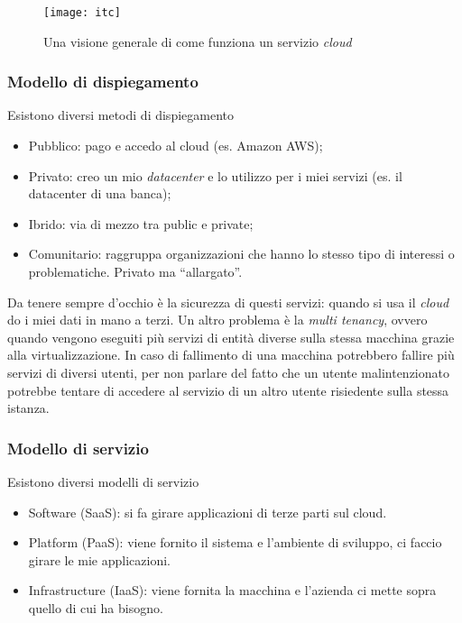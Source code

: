 \begin{figure}[H]
 \centering
 \texttt{[image: itc]}
 \caption{Una visione generale di come funziona un servizio \textit{cloud}}
\end{figure}

\subsubsection{Modello di dispiegamento}

Esistono diversi metodi di dispiegamento
\begin{itemize}
  \item Pubblico: pago e accedo al cloud (es. Amazon AWS);
  \item Privato: creo un mio \textit{datacenter} e lo utilizzo per i miei
  servizi (es. il datacenter di una banca);
  \item Ibrido: via di mezzo tra public e private;
  \item Comunitario: raggruppa organizzazioni che hanno lo stesso tipo di
  interessi o problematiche. Privato ma ``allargato''.
\end{itemize}

Da tenere sempre d'occhio è la sicurezza di questi servizi: quando si usa il
\textit{cloud} do i miei dati in mano a terzi. Un altro problema è la
\textit{multi tenancy}, ovvero quando vengono eseguiti più servizi di entità
diverse sulla stessa macchina grazie alla virtualizzazione. In caso di
fallimento di una macchina potrebbero fallire più servizi di diversi utenti,
per non parlare del fatto che un utente malintenzionato potrebbe tentare di
accedere al servizio di un altro utente risiedente sulla stessa istanza.

\subsubsection{Modello di servizio}

Esistono diversi modelli di servizio
\begin{itemize}
  \item Software (SaaS): si fa girare applicazioni di terze parti sul cloud.
  \item Platform (PaaS): viene fornito il sistema e l'ambiente di sviluppo, ci
  faccio girare le mie applicazioni.
  \item Infrastructure (IaaS): viene fornita la macchina e l'azienda ci mette
  sopra quello di cui ha bisogno.
\end{itemize}

